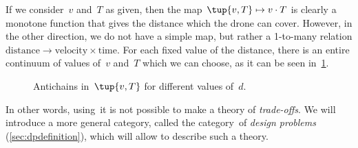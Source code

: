 {\begin{example}
		If we consider~$v$ and~$T$ as given, then the map~$\tup{v,T} \mapsto v\cdot T$ is clearly a monotone function that gives the distance which the drone can cover.
		However, in the other direction, we do not have a simple map, but rather a 1-to-many relation $\mathrm{distance}\to \mathrm{velocity}\times \mathrm{time}$.
		For each fixed value of the distance, there is an entire continuum of values of~$v$ and~$T$ which we can choose, as it can be seen in~\cref{fig:drone-example-antichain}.

		\begin{figure}[h!]
			\centering
			\caption{Antichains in~$\tup{v,T}$ for different values of~$d$.}
			\label{fig:drone-example-antichain}
		\end{figure}

	\end{example}

	In other words, using~\Pos it is not possible to make a theory of \emph{trade-offs}.
	We will introduce a more general category, called the category~\DP of \emph{design problems} (\cref{sec:dpdefinition}), which will allow to describe such a theory.


}

